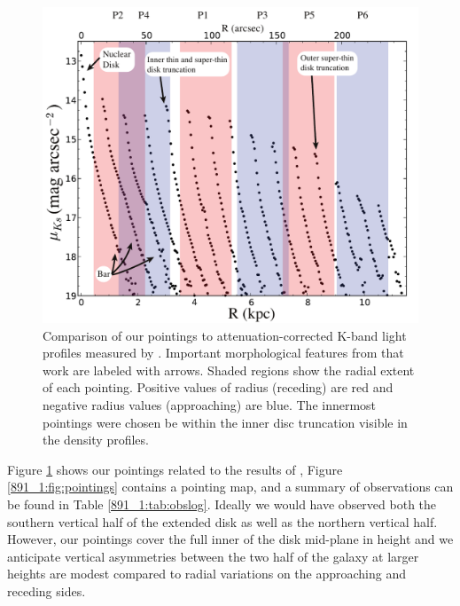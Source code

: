 \begin{figure}
  \centering
  \includegraphics[width=0.8\columnwidth]{891_1/figs/ASR_pointings.pdf}
  \caption[\GP pointings compared to known features in NGC
  891]{\label{891_1:fig:ASR_comp}\fixspacing Comparison of our \GP pointings
    to attenuation-corrected K-band light profiles measured by
    \citet{Schechtman-Rook13}. Important morphological features from
    that work are labeled with arrows. Shaded regions show the radial
    extent of each \GP pointing. Positive values of radius (receding)
    are red and negative radius values (approaching) are blue. The
    innermost \GP pointings were chosen be within the inner disc
    truncation visible in the density profiles.}
\end{figure}

Figure \ref{891_1:fig:ASR_comp} shows our \GP pointings related to the
results of \citet{Schechtman-Rook13}, Figure \ref{891_1:fig:pointings}
contains a pointing map, and a summary of observations can be found in
Table \ref{891_1:tab:obslog}. Ideally we would have observed both the
southern vertical half of the extended disk as well as the northern
vertical half. However, our pointings cover the full inner
 of the disk mid-plane in height and we anticipate
vertical asymmetries between the two half of the galaxy at larger
heights are modest compared to radial variations on the approaching
and receding sides.

